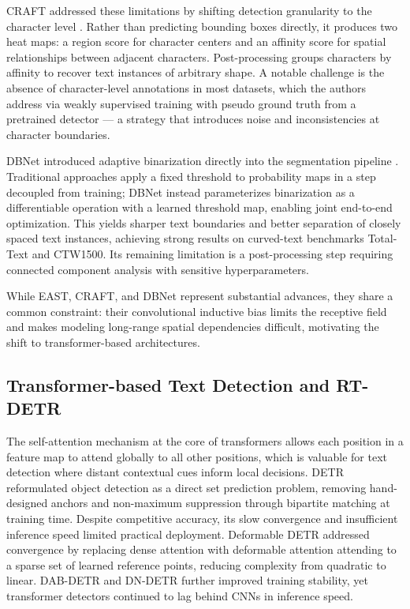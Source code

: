 CRAFT addressed these limitations by shifting detection granularity to the character level \cite{Baek2019}. Rather than predicting bounding boxes directly, it produces two heat maps: a region score for character centers and an affinity score for spatial relationships between adjacent characters. Post-processing groups characters by affinity to recover text instances of arbitrary shape. A notable challenge is the absence of character-level annotations in most datasets, which the authors address via weakly supervised training with pseudo ground truth from a pretrained detector — a strategy that introduces noise and inconsistencies at character boundaries.

DBNet introduced adaptive binarization directly into the segmentation pipeline \cite{Liao2019}. Traditional approaches apply a fixed threshold to probability maps in a step decoupled from training; DBNet instead parameterizes binarization as a differentiable operation with a learned threshold map, enabling joint end-to-end optimization. This yields sharper text boundaries and better separation of closely spaced text instances, achieving strong results on curved-text benchmarks Total-Text and CTW1500. Its remaining limitation is a post-processing step requiring connected component analysis with sensitive hyperparameters.

While EAST, CRAFT, and DBNet represent substantial advances, they share a common constraint: their convolutional inductive bias limits the receptive field and makes modeling long-range spatial dependencies difficult, motivating the shift to transformer-based architectures.

\subsection{Transformer-based Text Detection and RT-DETR}

The self-attention mechanism at the core of transformers \cite{Vaswani2023} allows each position in a feature map to attend globally to all other positions, which is valuable for text detection where distant contextual cues inform local decisions. DETR \cite{Carion2020} reformulated object detection as a direct set prediction problem, removing hand-designed anchors and non-maximum suppression through bipartite matching at training time. Despite competitive accuracy, its slow convergence and insufficient inference speed limited practical deployment. Deformable DETR \cite{Zhu2021} addressed convergence by replacing dense attention with deformable attention attending to a sparse set of learned reference points, reducing complexity from quadratic to linear. DAB-DETR and DN-DETR further improved training stability, yet transformer detectors continued to lag behind CNNs in inference speed.

